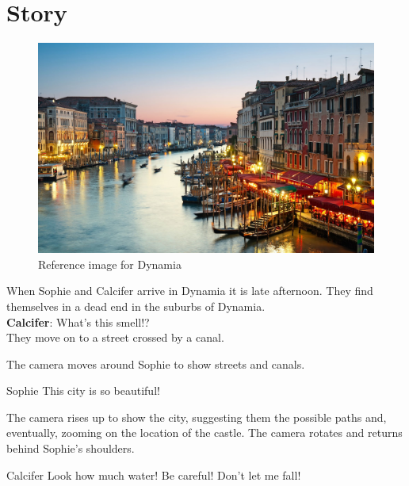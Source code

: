 \section{Story}

\begin{center}
  \begin{figure}[H]
    \centering
    \includegraphics[width=\textwidth]{../../References/Images/Dynamia/venice-restaurants-by-canal}
    \caption{Reference image for Dynamia}
  \end{figure}
\end{center}

When Sophie and Calcifer arrive in Dynamia it is late afternoon. They find themselves in a dead end in the suburbs of Dynamia.\\

\textbf{Calcifer}: What’s this smell!?\\

\noindent They move on to a street crossed by a canal.

\begin{screenplay}

The camera  moves around Sophie to show streets and canals. 

\begin{dialogue}[amazed]{Sophie}
This city is so beautiful!
\end{dialogue}

The camera rises up to show the city, suggesting them the possible paths and, eventually,  zooming on the location of the castle. The camera rotates and returns behind Sophie's shoulders. 

\begin{dialogue}[worried]{Calcifer}
Look how much water! Be careful! Don’t let me fall!
\end{dialogue}
\end{screenplay}

